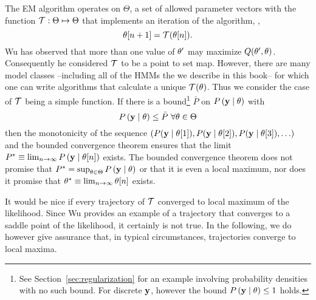 \newcommand{\EMmap}{{\cal T}} %
The EM algorithm operates on $\Theta$, a set of allowed parameter
vectors with the function $\EMmap:\Theta \mapsto \Theta$ that
implements an iteration of the algorithm, \ie,
\begin{equation*}
  \ti{\parameters}{n+1} = \EMmap (\ti{\parameters}{n}).
\end{equation*}
Wu\cite{Wu83} has observed that more than one value of $\theta'$
may maximize $Q(\theta',\theta)$.  Consequently he
considered $\EMmap$ to be a point to set map.  However, there are many
model classes --including all of the HMMs the we describe in this
book-- for which one can write algorithms that calculate a unique
$\EMmap(\theta)$.  Thus we consider the case of $\EMmap$ being a
simple function.  If there is a bound\footnote{See
  Section~\ref{sec:regularization} for an example involving
  probability densities with no such bound.  For discrete $\mathbf{y}$,
  however the bound $ P \left(\mathbf{y}\mid \theta \right) \leq 1$ holds.}
$\bar P$ on $ P \left(\mathbf{y}\mid \theta \right) $ with
\begin{equation*}
   P \left(\mathbf{y}\mid \theta \right) \leq \bar P ~ \forall \theta \in \Theta
\end{equation*}
then the monotonicity of the sequence $\left(
  P(\mathbf{y}\mid {\theta}{[1]}),
  P(\mathbf{y}\mid {\theta}{[2]}), P(\mathbf{y}\mid {\theta}{[3]}), \ldots \right)$ and the bounded
convergence theorem ensures that the limit $ P^* \equiv
\lim_{n\rightarrow \infty} P \left(\mathbf{y} \mid {\theta}{[n]} \right) $
exists.  The bounded convergence theorem does not promise that $P^* =
\sup_{\theta \in \Theta} P \left(\mathbf{y} \mid  \theta \right)$ or
that it is even a local maximum, nor does it promise that $\theta^*
\equiv \lim_{n \rightarrow \infty} {\theta}{[n]}$ exists.

It would be nice if every trajectory of $\EMmap$ converged to local
maximum of the likelihood.  Since Wu\cite{Wu83} provides an example of
a trajectory that converges to a saddle point of the likelihood, it
certainly is not true.  In the following, we do however give assurance
that, in typical circumstances, trajectories converge to local maxima.

